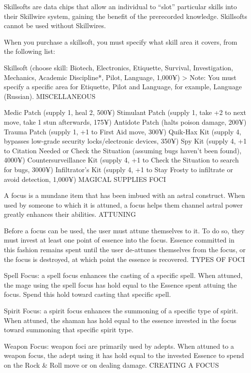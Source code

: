 Skillsofts are data chips that allow an individual to “slot” particular skills into their Skillwire system, gaining the benefit of the prerecorded knowledge. Skillsofts cannot be used without Skillwires.

When you purchase a skillsoft, you must specify what skill area it covers, from the following list:

Skillsoft (choose skill: Biotech, Electronics, Etiquette, Survival, Investigation, Mechanics, Academic Discipline*, Pilot, Language, 1,000¥) > Note: You must specify a specific area for Etiquette, Pilot and Language, for example, Language (Russian).
MISCELLANEOUS

Medic Patch (supply 1, heal 2, 500¥)
Stimulant Patch (supply 1, take +2 to next move, take 1 stun afterwards, 175¥)
Antidote Patch (halts poison damage, 200¥)
Trauma Patch (supply 1, +1 to First Aid move, 300¥)
Quik-Hax Kit (supply 4, bypasses low-grade security locks/electronic devices, 350¥)
Spy Kit (supply 4, +1 to Citation Needed or Check the Situation (assuming bugs haven’t been found), 4000¥)
Countersurveillance Kit (supply 4, +1 to Check the Situation to search for bugs, 3000¥)
Infiltrator’s Kit (supply 4, +1 to Stay Frosty to infiltrate or avoid detection, 1,000¥)
MAGICAL SUPPLIES
FOCI

A focus is a mundane item that has been imbued with an astral construct. When used by someone to which it is attuned, a focus helps them channel astral power greatly enhances their abilities.
ATTUNING

Before a focus can be used, the user must attune themselves to it. To do so, they must invest at least one point of essence into the focus. Essence committed in this fashion remains spent until the user de-attunes themselves from the focus, or the focus is destroyed, at which point the essence is recovered.
TYPES OF FOCI

Spell Focus: a spell focus enhances the casting of a specific spell. When attuned, the mage using the spell focus has hold equal to the Essence spent attuing the focus. Spend this hold toward casting that specific spell.

Spirit Focus: a spirit focus enhances the summoning of a specific type of spirit. When attuned, the shaman has hold equal to the essence invested in the focus toward summoning that specific spirit type.

Weapon Focus: weapon foci are primarily used by adepts. When attuned to a weapon focus, the adept using it has hold equal to the invested Essence to spend on the Rock \& Roll move or on dealing damage.
CREATING A FOCUS

